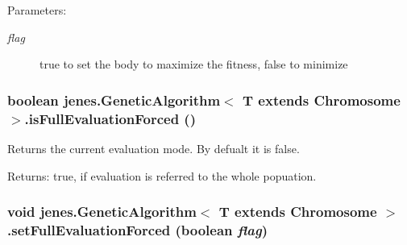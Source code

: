 \begin{Desc}
\item[Parameters:]
\begin{description}
\item[{\em flag}]true to set the body to maximize the fitness, false to minimize \end{description}
\end{Desc}
\hypertarget{classjenes_1_1_genetic_algorithm_3_01_t_01extends_01_chromosome_01_4_7305deb720716287d256832f0bd44785}{
\subsubsection[isFullEvaluationForced]{\setlength{\rightskip}{0pt plus 5cm}boolean jenes.GeneticAlgorithm$<$ T extends Chromosome $>$.isFullEvaluationForced ()}}
\label{classjenes_1_1_genetic_algorithm_3_01_t_01extends_01_chromosome_01_4_7305deb720716287d256832f0bd44785}


Returns the current evaluation mode. By defualt it is false. \begin{Desc}
\item[Returns:]true, if evaluation is referred to the whole popuation. \end{Desc}
\hypertarget{classjenes_1_1_genetic_algorithm_3_01_t_01extends_01_chromosome_01_4_9fe6f2d66ffcbce1233194871cdfc5ae}{
\subsubsection[setFullEvaluationForced]{\setlength{\rightskip}{0pt plus 5cm}void jenes.GeneticAlgorithm$<$ T extends Chromosome $>$.setFullEvaluationForced (boolean {\em flag})}}
\label{classjenes_1_1_genetic_algorithm_3_01_t_01extends_01_chromosome_01_4_9fe6f2d66ffcbce1233194871cdfc5ae}


